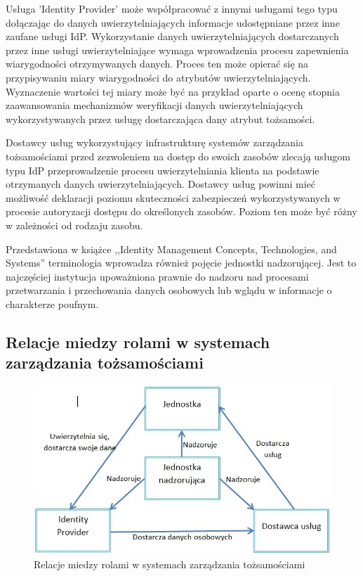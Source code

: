 		Usługa 'Identity Provider' może współpracować z innymi usługami tego typu dołączając do danych uwierzytelniających informacje udostępniane przez inne zaufane usługi IdP. Wykorzystanie danych uwierzytelniających dostarczanych przez inne usługi uwierzytelniające wymaga wprowadzenia procesu zapewnienia wiarygodności otrzymywanych danych. Proces ten może opierać się na przypisywaniu miary wiarygodności do atrybutów uwierzytelniających. Wyznaczenie wartości tej miary może być na przykład oparte o ocenę stopnia zaawansowania mechanizmów weryfikacji danych uwierzytelniających wykorzystywanych przez usługę dostarczająca dany atrybut tożsamości.

		Dostawcy usług wykorzystujący infrastrukturę systemów zarządzania tożsamościami przed zezwoleniem na dostęp do swoich zasobów zlecają usługom typu IdP przeprowadzenie procesu uwierzytelniania klienta na podstawie otrzymanych danych uwierzytelniających. Dostawcy usług powinni mieć możliwość deklaracji poziomu skuteczności zabezpieczeń wykorzystywanych w procesie autoryzacji dostępu do określonych zasobów. Poziom ten może być różny w zależności od rodzaju zasobu.

		Przedstawiona w książce ,,Identity Management Concepts, Technologies, and Systems'' terminologia wprowadza również pojęcie jednostki nadzorującej\cite{Bertino11}. Jest to najczęściej instytucja upoważniona prawnie do nadzoru nad procesami przetwarzania i przechowania danych osobowych lub wglądu  w informacje o charakterze poufnym.

	\subsection{Relacje miedzy rolami w systemach zarządzania tożsamościami}

		\begin{figure}[h]
			\centering
			\includegraphics[width=15cm]{img/idmRelations.jpg}
			\caption{Relacje miedzy rolami w systemach zarządzania tożsamościami}
			\label{Relacje miedzy rolami w systemach zarządzania tożsamościami}
		\end{figure}

